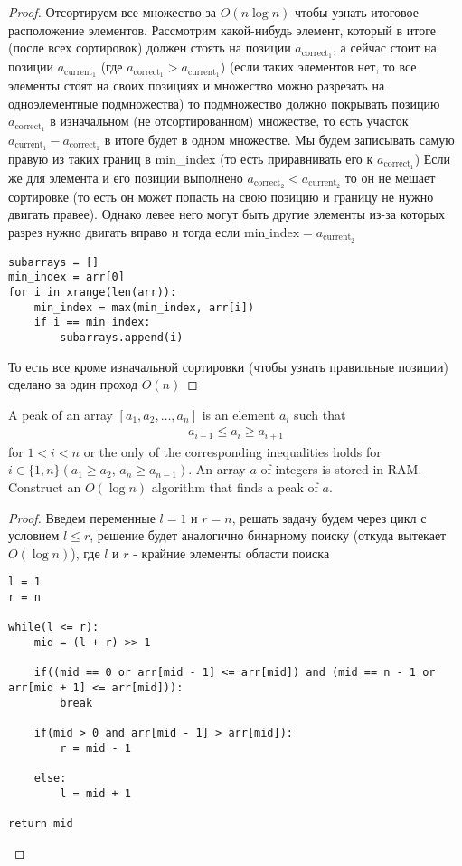 \begin{proof}
Отсортируем все множество за $O(n \log n)$ чтобы узнать итоговое расположение элементов.
\vskip 0.1in \noindent
Рассмотрим какой-нибудь элемент, который в итоге (после всех сортировок) должен стоять на позиции $a_{\text{correct}_1}$, а сейчас стоит на позиции $a_{\text{current}_1}$ (где $a_{\text{correct}_1} > a_{\text{current}_1}$) (если таких элементов нет, то все элементы стоят на своих позициях и множество можно разрезать на одноэлементные подмножества) то подмножество должно покрывать позицию $a_{\text{correct}_1}$ в изначальном (не отсортированном) множестве, то есть участок $a_{\text{current}_1}-a_{\text{correct}_1}$ в итоге будет в одном множестве. Мы будем записывать самую правую из таких границ в min\_index (то есть приравнивать его к $a_{\text{correct}_1}$)
\vskip 0.1in \noindent
Если же для элемента и его позиции выполнено $a_{\text{correct}_2} < a_{\text{current}_2}$ то он не мешает сортировке (то есть он может попасть на свою позицию и границу не нужно двигать правее). Однако левее него могут быть другие элементы из-за которых разрез нужно двигать вправо и тогда если $\text{min\_index} = a_{\text{current}_2}$
\vskip 0.2in
\begin{lstlisting}
subarrays = []
min_index = arr[0]
for i in xrange(len(arr)):
    min_index = max(min_index, arr[i])
    if i == min_index:
        subarrays.append(i)
\end{lstlisting}
\vskip 0.1in \noindent
То есть все кроме изначальной сортировки (чтобы узнать правильные позиции) сделано за один проход $O(n)$
\end{proof}
\vskip 0.6in




\begin{prob}
A peak of an array $\left[a_1, a_2, \ldots, a_n\right]$ is an element $a_i$ such that
\begin{gather*}
    a_{i-1} \leqslant a_i \geqslant a_{i+1}
\end{gather*}
for $1<i<n$ or the only of the corresponding inequalities holds for $i \in\{1, n\}\left(a_1 \geqslant a_2\right.$, $\left.a_n \geqslant a_{n-1}\right)$. An array $a$ of integers is stored in RAM. Construct an $O(\log n)$ algorithm that finds a peak of $a$.
\end{prob}

\begin{proof}
Введем переменные $l = 1$ и $r = n$, решать задачу будем через цикл с условием $l \leq r$, решение будет аналогично бинарному поиску (откуда вытекает $O(\log n)$), где $l$ и $r$ - крайние элементы области поиска
\begin{lstlisting}
l = 1
r = n

while(l <= r):
    mid = (l + r) >> 1

    if((mid == 0 or arr[mid - 1] <= arr[mid]) and (mid == n - 1 or arr[mid + 1] <= arr[mid])):
        break

    if(mid > 0 and arr[mid - 1] > arr[mid]):
        r = mid - 1

    else:
        l = mid + 1

return mid
\end{lstlisting}
\end{proof}
\vskip 0.6in




